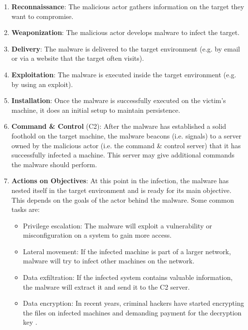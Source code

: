 \begin{enumerate}
    \item \textbf{Reconnaissance}: The malicious actor gathers information on the target they want to compromise.
    \item \textbf{Weaponization}: The malicious actor develops malware to infect the target.
    \item \textbf{Delivery}: The malware is delivered to the target environment (e.g. by email or via a website that the target often visits).
    \item \textbf{Exploitation}: The malware is executed inside the target environment (e.g. by using an exploit).
    \item \textbf{Installation}: Once the malware is successfully executed on the victim's machine, it does an initial setup to maintain persistence.
    \item \textbf{Command \& Control} (C2): After the malware has established a solid foothold on the target machine, the malware beacons (i.e. signals) to a server owned by the malicious actor (i.e. the command \& control server) that it has successfully infected a machine. This server may give additional commands the malware should perform.
    \item \textbf{Actions on Objectives}: At this point in the infection, the malware has nested itself in the target environment and is ready for its main objective. This depends on the goals of the actor behind the malware. Some common tasks are:
    \begin{itemize}
        \item Privilege escalation: The malware will exploit a vulnerability or misconfiguration on a system to gain more access.

        \item Lateral movement: If the infected machine is part of a larger network, malware will try to infect other machines on the network.

        \item Data exfiltration: If the infected system contains valuable information, the malware will extract it and send it to the C2 server.

        \item Data encryption: In recent years, criminal hackers have started encrypting the files on infected machines and demanding payment for the decryption key \cite{ransomware}.
    \end{itemize}
\end{enumerate}

